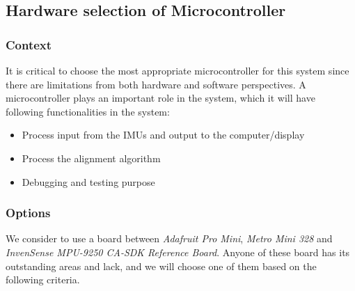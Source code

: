 


\subsection{Hardware selection of Microcontroller}
\subsubsection{Context}
It is critical to choose the most appropriate microcontroller for this system since there are limitations from both hardware and software perspectives.
A microcontroller plays an important role in the system, which it will have following functionalities in the system:

\begin{itemize}
	\item Process input from the IMUs and output to the computer/display
	\item Process the alignment algorithm
	\item Debugging and testing purpose\\
\end{itemize}

\subsubsection{Options}
We consider to use a board between \textit{Adafruit Pro Mini}\cite{arduino}, \textit{Metro Mini 328}\cite{trinket} and \textit{InvenSense MPU-9250 CA-SDK Reference Board}\cite{MPU9250SDK}.
Anyone of these board has its outstanding areas and lack, and we will choose one of them based on the following criteria.\\

